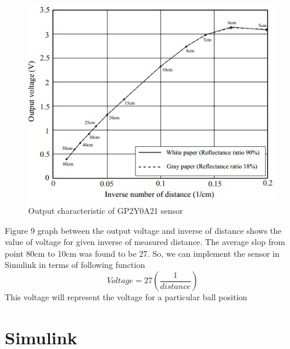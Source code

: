\documentclass{article}
\begin{document}
 \begin{figure}[h!]
  \includegraphics[width=\linewidth]{sensor.jpg}
  \caption{Output characteristic of GP2Y0A21 sensor }
  \label{fig:boat1}
\end{figure}
Figure 9 graph between the output voltage and inverse of distance shows the value of voltage for given inverse of measured distance. The average slop from point 80cm to 10cm was found to be 27. So, we can implement the sensor in Simulink in terms of following function
\[ Voltage = 27 (\frac{1}{distance})\]
This voltage will represent the voltage for a particular ball position

\section{Simulink}
\end{document}
